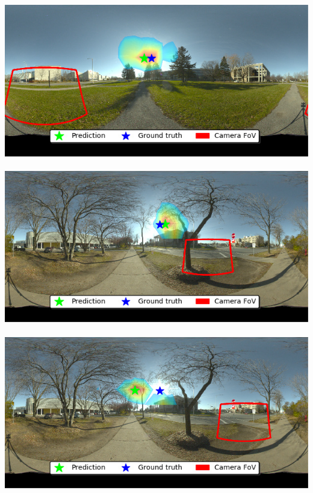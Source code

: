 \begin{minipage}{\linewidth}
\begin{multicols}{4}
\includegraphics[width=\mywidth]{AG8A2833_Panorama_hdr-corrected_004.jpg}\\
\vspace{\panoheight}\\
\includegraphics[width=\mywidth]{AG8A2875_Panorama_hdr-corrected_002.jpg}\\
\vspace{\panoheight}\\
\includegraphics[width=\mywidth]{AG8A2875_Panorama_hdr-corrected_008.jpg}\\
\vspace{\panoheight}\\

\end{multicols}
\end{minipage}
